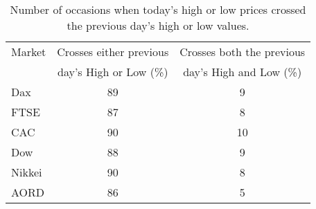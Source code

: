 \begin{table}[!htbp] \centering 
  \caption[Today's H/L Prices in relation to previous day's HL]{Number of occasions when today's high or low prices crossed the previous day's high or low values.} 
  \label{tab:highlow}
\begin{tabular}{lcc } 
\toprule 
Market & Crosses either previous    & Crosses both the previous \\ 
       & day's High or Low (\%)     &  day's High and Low (\%)       \\
\midrule 
Dax  & 89  & 9  \\ 
FTSE & 87  & 8  \\ 
CAC  & 90  & 10 \\ 
Dow  & 88  & 9  \\ 
Nikkei & 90 & 8 \\ 
AORD   & 86 & 5 \\
\bottomrule 
\end{tabular} 
\end{table} 



